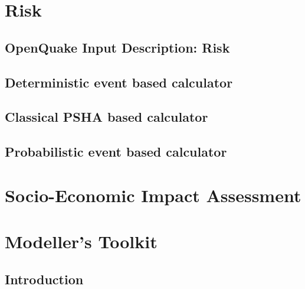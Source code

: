 \documentclass[12pt,a4paper,headings=small,version=first,dvips]{scrbook}
\begin{document}
\part{Risk}
\chapter{OpenQuake Input Description: Risk}
	
\chapter{Deterministic event based calculator}
	
\chapter{Classical PSHA based calculator}
	
\chapter{Probabilistic event based calculator}
	
\part{Socio-Economic Impact Assessment}
	
\part{Modeller's Toolkit}
\chapter{Introduction}
	
\end{document}
